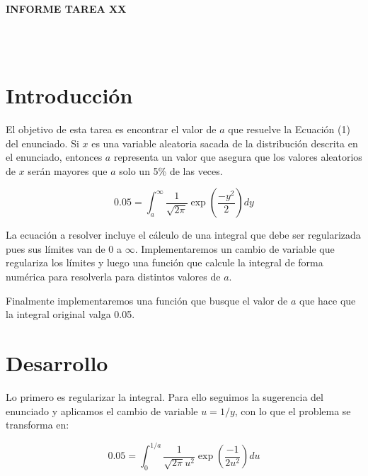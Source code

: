 \documentclass[letter, 11pt]{article}
\begin{document}
\thispagestyle{firstpage}

\begin{center}
  {\uppercase{\LARGE \bf Informe Tarea XX}}
\end{center}

\\
\\


\section{Introducción}

El objetivo de esta tarea es encontrar el valor de $a$ que resuelve la Ecuación
(1) del enunciado. Si $x$ es una variable aleatoria sacada de la distribución
descrita en el enunciado, entonces $a$ representa un valor que asegura que los
valores aleatorios de $x$ serán mayores que $a$ solo un 5\% de las veces.

\begin{equation}
0.05 = \int_{a}^{\infty} \frac{1}{\sqrt{2\pi}} \exp\left({\frac{-y^2}{2}}\right) dy
\end{equation}

La ecuación a resolver incluye el cálculo de una integral que debe ser
regularizada pues sus límites van de $0$ a $\infty$. Implementaremos un cambio
de variable que regulariza los límites y luego una función que calcule la
integral de forma numérica para resolverla para distintos valores de $a$.

Finalmente implementaremos una función que busque el valor de $a$ que hace que la
integral original valga 0.05.

\section{Desarrollo}

Lo primero es regularizar la integral. Para ello seguimos la sugerencia del
enunciado y aplicamos el cambio de variable $u=1/y$, con lo que el problema se
transforma en:

\begin{equation}
0.05 = \int_0^{1/a} \frac{1}{\sqrt{2\pi}u^2} \exp\left({\frac{-1}{2u^2}}\right) du
\end{equation}
\end{document}
